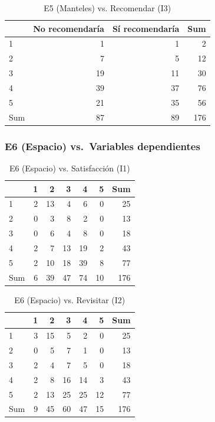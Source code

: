 \documentclass[
  spanish,
]{article}
\begin{document}
\begin{longtable}[t]{lrrr}
\caption{\label{tab:cont-e5-recom}E5 (Manteles) vs. Recomendar (I3)}\\
\toprule
 & No recomendaría & Sí recomendaría & Sum\\
\midrule
1 & 1 & 1 & 2\\
2 & 7 & 5 & 12\\
3 & 19 & 11 & 30\\
4 & 39 & 37 & 76\\
5 & 21 & 35 & 56\\
\addlinespace
Sum & 87 & 89 & 176\\
\bottomrule
\end{longtable}

\subsubsection{E6 (Espacio) vs.~Variables
dependientes}\label{e6-espacio-vs.-variables-dependientes}

\begin{longtable}[t]{lrrrrrr}
\caption{\label{tab:cont-e6-satisf}E6 (Espacio) vs. Satisfacción (I1)}\\
\toprule
 & 1 & 2 & 3 & 4 & 5 & Sum\\
\midrule
1 & 2 & 13 & 4 & 6 & 0 & 25\\
2 & 0 & 3 & 8 & 2 & 0 & 13\\
3 & 0 & 6 & 4 & 8 & 0 & 18\\
4 & 2 & 7 & 13 & 19 & 2 & 43\\
5 & 2 & 10 & 18 & 39 & 8 & 77\\
\addlinespace
Sum & 6 & 39 & 47 & 74 & 10 & 176\\
\bottomrule
\end{longtable}

\begin{longtable}[t]{lrrrrrr}
\caption{\label{tab:cont-e6-revis}E6 (Espacio) vs. Revisitar (I2)}\\
\toprule
 & 1 & 2 & 3 & 4 & 5 & Sum\\
\midrule
1 & 3 & 15 & 5 & 2 & 0 & 25\\
2 & 0 & 5 & 7 & 1 & 0 & 13\\
3 & 2 & 4 & 7 & 5 & 0 & 18\\
4 & 2 & 8 & 16 & 14 & 3 & 43\\
5 & 2 & 13 & 25 & 25 & 12 & 77\\
\addlinespace
Sum & 9 & 45 & 60 & 47 & 15 & 176\\
\bottomrule
\end{longtable}
\end{document}
